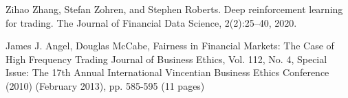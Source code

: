 \documentclass[a4paper,14pt]{extarticle}
\begin{document}
\begin{thebibliography}{0}
    \hypertarget{19}{}

	{Zihao Zhang, Stefan Zohren, and Stephen Roberts. Deep reinforcement learning for trading. The Journal of Financial Data Science, 2(2):25–40, 2020.}

    \hypertarget{20}{}
	{James J. Angel, Douglas McCabe,
    Fairness in Financial Markets: The Case of High Frequency Trading
    Journal of Business Ethics, Vol. 112, No. 4, Special Issue: The 17th Annual International Vincentian Business Ethics Conference (2010) (February 2013), pp. 585-595 (11 pages)}

    


    



    
 
\end{thebibliography}
	
	
\end{document}
